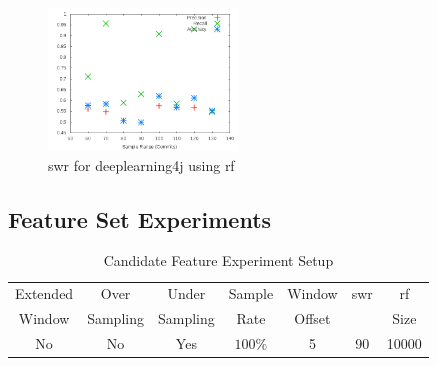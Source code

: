 \begin{figure}[h]
    \centering
        \includegraphics[width=0.45\textwidth]{images/rf/test_1/deeplearning4j_sample_range}
    \caption{\gls{swr} for deeplearning4j using \gls{rf}}
    \label{fig:test_1_deeplearning4j_rf}
\end{figure}


\subsection{Feature Set Experiments}

\begin{table}[h]
\begin{center}

    \begin{tabular}{|c|c|c|c|c|c|c|}
        \hline
        Extended & Over & Under & Sample & Window & \gls{swr} & \gls{rf} \\
        Window & Sampling & Sampling & Rate & Offset &  & Size \\ \hline
        No & No & Yes & $100\%$ & 5 & 90 & 10000 \\ \hline
    \end{tabular}
    \caption{Candidate Feature Experiment Setup}
    \label{tab:rf_feature_experiment_setup}
\end{center}

\end{table}



